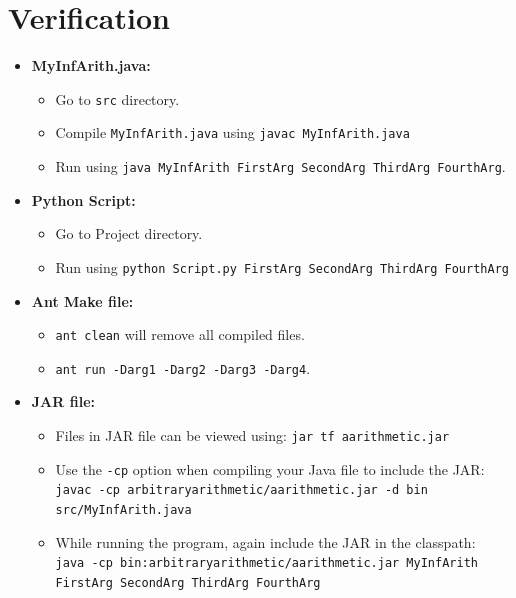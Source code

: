 \documentclass{article}
\begin{document}
\section{Verification}
\begin{itemize}
    \item \textbf{MyInfArith.java:}
    \begin{itemize}
        \item Go to \texttt{src} directory.
        \item Compile \texttt{MyInfArith.java} using \texttt{javac MyInfArith.java}
        \item Run using \texttt{java MyInfArith FirstArg SecondArg ThirdArg FourthArg}.
    \end{itemize}
    
    \item \textbf{Python Script:}
    \begin{itemize}
        \item Go to Project directory.
        \item Run using \texttt{python Script.py FirstArg SecondArg ThirdArg FourthArg}
    \end{itemize}
    
    \item \textbf{Ant Make file:}
    \begin{itemize}
        \item \texttt{ant clean} will remove all compiled files.
        \item \texttt{ant run -Darg1 -Darg2 -Darg3 -Darg4}.
    \end{itemize}
    
    \item \textbf{JAR file:}
    \begin{itemize}
        \item Files in JAR file can be viewed using: \texttt{jar tf aarithmetic.jar}
        \item Use the \texttt{-cp} option when compiling your Java file to include the JAR: \\
        \texttt{javac -cp arbitraryarithmetic/aarithmetic.jar -d bin src/MyInfArith.java}
        \item While running the program, again include the JAR in the classpath: \\
        \texttt{java -cp bin:arbitraryarithmetic/aarithmetic.jar MyInfArith FirstArg SecondArg ThirdArg FourthArg}
    \end{itemize}
\end{itemize}
\end{document}
